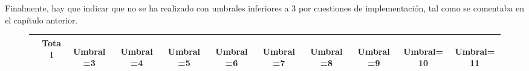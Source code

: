 Finalmente, hay que indicar que no se ha realizado con umbrales inferiores a 3 por cuestiones de implementación, tal como se comentaba en el capítulo anterior.

\begin{figure}
\centering
{ \scriptsize
\begin{tabular}{|l|c|c|c|c|c|c|c|c|c|c|}
\hline
& Total 
&\begin{sideways} Umbral=3 \end{sideways} 
&\begin{sideways} Umbral=4 \end{sideways} 
&\begin{sideways} Umbral=5 \end{sideways} 
&\begin{sideways} Umbral=6 \end{sideways} 
&\begin{sideways} Umbral=7 \end{sideways} 
&\begin{sideways} Umbral=8 \end{sideways} 
&\begin{sideways} Umbral=9 \end{sideways} 
&\begin{sideways} Umbral=10 \end{sideways} 
&\begin{sideways} Umbral=11 \end{sideways} 
 \\ \hline


\end{tabular}}
\end{figure}
